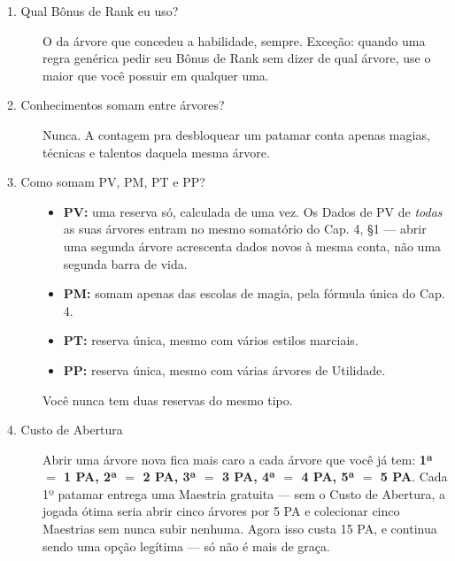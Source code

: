 \begin{description}
    \item[1. Qual Bônus de Rank eu uso?] O da árvore que concedeu a habilidade, sempre.
          Exceção: quando uma regra genérica pedir seu Bônus de Rank sem dizer de qual
          árvore, use o maior que você possuir em qualquer uma.

    \item[2. Conhecimentos somam entre árvores?] Nunca. A contagem pra desbloquear um
          patamar conta apenas magias, técnicas e talentos daquela mesma árvore.

    \item[3. Como somam PV, PM, PT e PP?] \hfill
          \begin{itemize}
              \item \textbf{PV:} uma reserva só, calculada de uma vez. Os Dados de PV de
                    \emph{todas} as suas árvores entram no mesmo somatório do Cap. 4, §1 ---
                    abrir uma segunda árvore acrescenta dados novos à mesma conta, não uma
                    segunda barra de vida.
              \item \textbf{PM:} somam apenas das escolas de magia, pela fórmula única do
                    Cap. 4.
              \item \textbf{PT:} reserva única, mesmo com vários estilos marciais.
              \item \textbf{PP:} reserva única, mesmo com várias árvores de Utilidade.
          \end{itemize}
          Você nunca tem duas reservas do mesmo tipo.

    \item[4. Custo de Abertura] Abrir uma árvore nova fica mais caro a cada árvore que você
          já tem: \textbf{1ª $=$ 1 PA, 2ª $=$ 2 PA, 3ª $=$ 3 PA, 4ª $=$ 4 PA, 5ª $=$ 5 PA}.
          Cada 1º patamar entrega uma Maestria gratuita --- sem o Custo de Abertura, a
          jogada ótima seria abrir cinco árvores por 5 PA e colecionar cinco Maestrias sem
          nunca subir nenhuma. Agora isso custa 15 PA, e continua sendo uma opção legítima
          --- só não é mais de graça.
\end{description}

